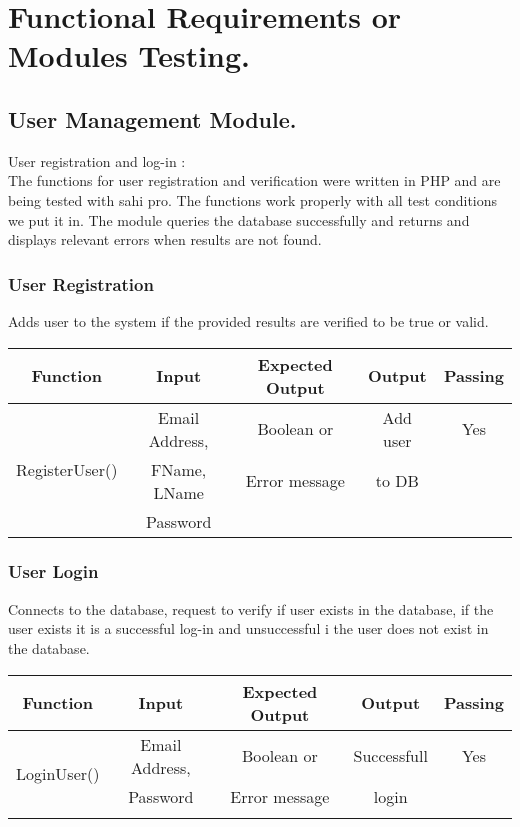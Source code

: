 \documentclass[runningheads,a4paper]{article}
\begin{document}
\section{Functional Requirements or Modules Testing.}
\raggedright{
\subsection{User Management Module.}
User registration and log-in : \\
The functions for user registration and verification were written in PHP and are being tested with sahi pro. The functions work properly with all test conditions we put it in. The module queries the database successfully and returns and displays relevant errors when results are not found.

\subsubsection{User Registration}
Adds user to the system if the provided results are verified to be true or valid.
\begin{center}
\begin{tabular}{ |c|c|c|c|c| } 
\hline
Function & Input & Expected Output & Output & Passing \\
\hline
\multirow{3}{8em}{RegisterUser()} & Email Address,  & Boolean or & Add user &Yes\\ 
& FName, LName & Error message & to DB &\\ 
& Password &  & &\\ 
\hline
\end{tabular}
\end{center}

\subsubsection{User Login}
Connects to the database, request to verify if user exists in the database, if the user exists it is a successful log-in and unsuccessful i the user does not exist in the database.
\begin{center}
\begin{tabular}{ |c|c|c|c|c| } 
\hline
Function & Input & Expected Output & Output & Passing \\
\hline
\multirow{3}{8em}{LoginUser()} & Email Address,  & Boolean or & Successfull &Yes\\ 
& Password & Error message & login &\\ 
&  &  & &\\ 
\hline
\end{tabular}
\end{center}



}
\end{document}
